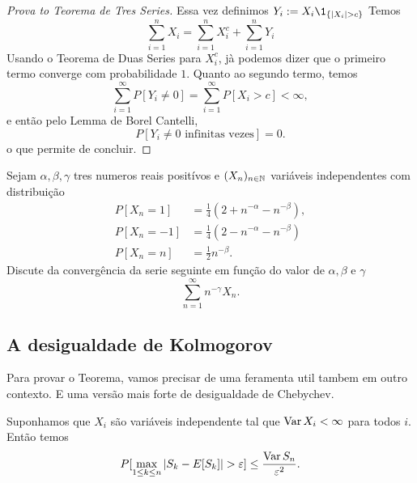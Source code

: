 \begin{topics}
\begin{proof}[Prova to Teorema de Tres Series]
  Essa vez definimos $Y_i:= X_i \1_{\{|X_i| > c\}}$
  Temos
  \begin{equation}
    \sum_{i=1}^n X_i =  \sum_{i=1}^n X_i^c + \sum_{i=1}^n Y_i
  \end{equation}
  Usando o Teorema de Duas Series para $X_i^c$, jà podemos dizer que o primeiro termo converge com probabilidade $1$.
  Quanto ao segundo termo, temos
  \begin{equation}
    \sum_{i = 1}^{\infty} P[Y_i\ne 0]=   \sum_{i=1}^{\infty} P[ X_i>c ]< \infty,
  \end{equation}
  e então pelo Lemma de Borel Cantelli,
  \begin{equation}
    P[ Y_i \ne 0 \text{ infinitas vezes}]=0.
  \end{equation}
  o que permite de concluir.
\end{proof}


\begin{exercise}
Sejam $\alpha, \beta, \gamma$ tres numeros reais positívos e $(X_n)_{n\in {\ensuremath{\mathbb N}}}$ variáveis independentes com distribuição
 \begin{equation} \begin{split}
 P[X_n=1]&=\frac{1}{4}\left(2+n^{-\alpha}-n^{-\beta}\right), \\
 P[X_n=-1]&=\frac{1}{4}\left(2-n^{-\alpha}-n^{-\beta}\right) \\
 P[X_n= n]&= \frac{1}{2} n^{-\beta}.
 \end{split}
\end{equation}
Discute da convergência da serie seguinte em função do valor de $\alpha, \beta$ e $\gamma$
\begin{equation}
 \sum_{n=1}^{\infty} n^{-\gamma} X_n.
\end{equation}




\end{exercise}

\subsection{A desigualdade de Kolmogorov}

Para provar o Teorema, vamos precisar de uma feramenta util tambem em outro contexto.
E uma versão mais forte de desigualdade de Chebychev.

\medskip


\begin{theorem}
Suponhamos que $X_i$ são variáveis independente tal que $\operatorname{Var} X_i<\infty$ para todos $i$.
Então temos
\begin{equation}
 P[\max_{1\le k\le n} |S_k-E[S_k]|>\gep ]\le  \frac{\Var S_n}{\gep^2}.
\end{equation}


\end{theorem}
\end{topics}
